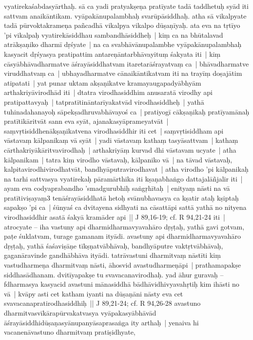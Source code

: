 \documentclass[article,a4paper]{memoir}
\begin{document}
vyatirekaśabdasyā\-rthaḥ. sā\- ca yadi pratyakṣeṇa pratī\-yate tadā\- taddhetuḥ syā\-d iti sattvam anaikā\-ntikam. vyā\-pakā\-nupalambhaḥ svarū\-pā\-siddhaḥ. atha sā\- vikalpyate tadā\- pū\-rvoktakrameṇa pañcadhā\- vikalpya vikalpo dū\-ṣaṇī\-yaḥ. \label{thakur75-87.4} ata eva na tṛtī\-yo 'pi vikalpaḥ vyatirekā\-siddhau sambandhā\-siddheḥ | \label{thakur75-87.6} kiṃ ca na bhū\-talavad atrā\-kṣaṇiko dharmī\- dṛśyate | na ca svabhā\-vā\-nupalambhe vyā\-pakā\-nupalambhaḥ kasyacit dṛśyasya pratipattim antareṇā\-ntarbhā\-vayituṃ śakyata iti | \label{thakur75-87.9} kiṃ cā\-syā\-bhā\-vadharmatve ā\-śrayā\-siddhatvam itaretarā\-śrayatvaṃ ca | bhā\-vadharmatve viruddhatvaṃ ca | ubhayadharmatve cā\-naikā\-ntikatvam iti na trayī\-ṃ doṣajā\-tim atipatati | \label{thakur75-87.11} yat punar uktam akṣaṇikatve kramayaugapadyā\-bhyā\-m arthakriyā\-virodhā\-d iti | dtatra virodhasiddhim anusaratā\- virodhy api pratipattavyaḥ | tatpratī\-tinā\-ntarī\-yakatvā\-d virodhasiddheḥ | yathā\- tuhinadahanayoḥ sā\-pekṣadhruvabhā\-vayoś ca | \label{thakur75-87.13} pratiyogī\- cā\-kṣaṇikaḥ pratī\-yamā\-naḥ pratī\-tikā\-ritvā\-t sann eva syā\-t, ajanakasyā\-prameyatvā\-t | \label{thakur75-87.15} saṃvṛtisiddhenā\-kṣaṇikatvena virodhasiddhir iti cet | saṃvṛtisiddham api vā\-stavaṃ kā\-lpanikaṃ vā\- syā\-t | \label{thakur75-87.17} yadi vā\-stavaṃ kathaṃ tasyā\-sattvam | kathaṃ cā\-rthakriyā\-kā\-ritvavirodhaḥ | arthakriyā\-ṃ kurvad dhi vā\-stavam ucyate | \label{thakur75-87.19} atha kā\-lpanikam | tatra kiṃ virodho vā\-stavaḥ, kā\-lpaniko vā\- | na tā\-vad vā\-stavaḥ, kalpitavirodhivirodhatvā\-t, bandhyā\-putravirodhavat | atha virodho 'pi kā\-lpanikaḥ na tarhi sattvasya vyatirekaḥ pā\-ramā\-rthika iti kṣaṇabhaṅgo dattajalā\-ñjalir iti | \label{thakur75-87.23} ayam eva codyaprabandho 'smadgurubhiḥ saṅgṛhī\-taḥ | enityaṃ nā\-sti na vā\- pratī\-tiviṣayaṃ3 tenā\-śrayā\-siddhatā\- hetoḥ svā\-nubhavasya ca kṣatir ataḥ kṣiptaḥ sapakṣo 'pi ca | śū\-nyaś ca dvitayena sidhyati na cā\-sattā\-pi sattā\- yathā\- no nityena virodhasiddhir asatā\- śakyā\- kramā\-der api || J 89,16-19; cf. R 94,21-24 iti | \label{thakur75-87.28} atrocyate – iha vastuny api dharmidharmavyavahā\-ro dṛṣṭaḥ, yathā\- gavi gotvam, paṭe śuklatvam, turage gamanam ityā\-di. avastuny api dharmidharmavyavahā\-ro dṛṣṭaḥ, yathā\- śaśaviṣā\-ṇe tī\-kṣṇatvā\-bhā\-vaḥ, bandhyā\-putre vaktṛtvā\-bhā\-vaḥ, gaganā\-ravinde gandhā\-bhā\-va ityā\-di. tatrā\-vastuni dharmitvaṃ nā\-stī\-ti kiṃ vastudharmeṇa dharmitvaṃ nā\-sti, ā\-hosvid avastudharmeṇā\-pi | \label{thakur75-88.3} prathamapakṣe siddhasā\-dhanam. dvitī\-yapakṣe tu svavacanavirodhaḥ. yad ā\-hur guravaḥ – fdharmasya kasyacid avastuni mā\-nasiddhā\- bā\-dhā\-vidhivyavahṛtiḥ kim ihā\-sti no vā\- | kvā\-py asti cet katham iyanti na dū\-ṣaṇā\-ni nā\-sty eva cet svavacanapratirodhasiddhiḥ || J 89,21-24; cf. R 94,26-28 \label{thakur75-88.8} avastuno dharmitvasvī\-kā\-rapū\-rvakatvasya vyā\-pakasyā\-bhā\-vā\-d ā\-śrayā\-siddhidū\-ṣaṇasyā\-nupanyā\-saprasaṅga ity arthaḥ | yenaiva hi vacanenā\-vastuno dharmitvaṃ pratiṣidhyate, 
\end{document}
